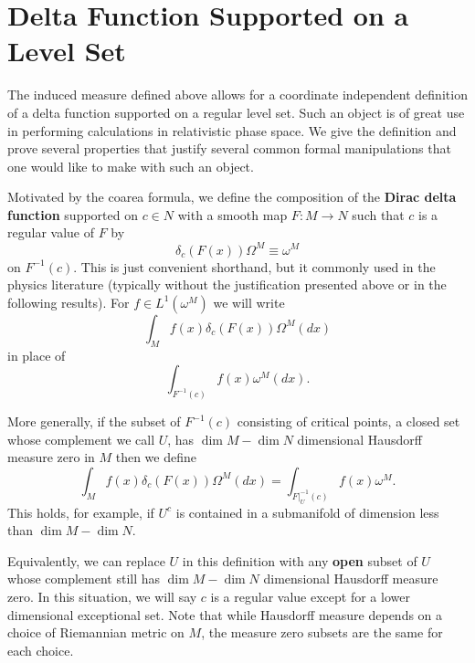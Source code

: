 \section{Delta Function Supported on a Level Set}
 The induced measure defined above allows for a coordinate independent definition of a delta function supported on a regular level set.  Such an object is of great use in performing calculations in relativistic phase space.  We give the definition and prove several properties that justify several common formal manipulations that one would like to make with such an object.
\begin{definition}
Motivated by the coarea formula, we define the composition of the {\bf Dirac delta function} supported on $c\in N$ with a smooth map $F:M\rightarrow N$ such that $c$ is a regular value of $F$ by
\begin{equation}\label{delta_def}
 \delta_c(F(x))\Omega^M \equiv \omega^M
\end{equation}
on $F^{-1}(c)$.  This is just convenient shorthand, but it commonly used in the physics literature (typically without the justification presented above or in the following results).   For $f\in L^1(\omega^M)$ we will write 
\begin{equation}
\int_M f(x)\delta_c(F(x))\Omega^M(dx)
\end{equation} 
in place of 
\begin{equation}
\int_{F^{-1}(c)} f(x) \omega^M(dx).
\end{equation}



More generally, if the subset of $F^{-1}(c)$ consisting of critical points, a closed set whose complement we call $U$, has $\dim M-\dim N$ dimensional Hausdorff measure zero in $M$ then we define
\begin{equation}
\int_M f(x)\delta_c(F(x))\Omega^M(dx)=\int_{F|_U^{-1}(c)} f(x)\omega^M.
\end{equation}
This holds, for example, if $U^c$ is contained in a submanifold of dimension less than  $\dim M-\dim N$.  

Equivalently, we can replace $U$ in this definition with any {\bf open} subset of $U$ whose complement still has $\dim M-\dim N$ dimensional Hausdorff measure zero. In this situation, we will say $c$ is a regular value except for a lower dimensional exceptional set.  Note that while Hausdorff measure depends on a choice of Riemannian metric on $M$, the measure zero subsets are the same for each choice.
\begin{comment}
Hausdorff measures commutes with restriction to subspaces (w/subspace metric)
Hausdorff measure on a submanifold induced by pullback metric tensor equals that induced by restriction of distance metric from ambient space.
Hausdorff measure of subsets of a manifold being zero is well defined (i.e. ind of choice of metric) so we can define k-dimensional measure zero for any k (integer or not). This follows since vol forms are abs cont wrt hausdorff measure of that dim
\end{comment}
\end{definition}

